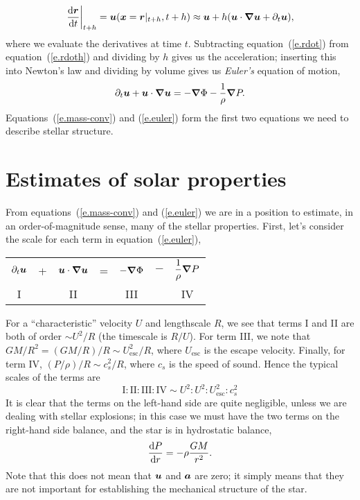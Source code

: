 \begin{equation}\label{e.rdoth}
\left.\frac{\mathrm{d}\boldsymbol{r}}{\mathrm{d} t}\right|_{t+h} = \boldsymbol{u}(\boldsymbol{x} = \boldsymbol{r}|_{t+h},t+h)\approx \boldsymbol{u} + h(\boldsymbol{u}\cdot\boldsymbol{\nabla}\boldsymbol{u} + \partial_{t}\boldsymbol{u}),
\end{equation}
where we evaluate the derivatives at time $t$. Subtracting equation~(\ref{e.rdot}) from equation~(\ref{e.rdoth}) and dividing by $h$ gives us the acceleration; inserting this into Newton's law and dividing by volume gives us \emph{Euler's} equation of motion,
\begin{equation}\label{e.euler}
\partial_{t}\boldsymbol{u} + \boldsymbol{u}\cdot\boldsymbol{\nabla}\boldsymbol{u} = -\boldsymbol{\nabla} \Phi - \frac{1}{\rho}\boldsymbol{\nabla} P.
\end{equation}
Equations~(\ref{e.mass-conv}) and (\ref{e.euler}) form the first two equations we need to describe stellar structure.

\section{Estimates of solar properties}

From equations~(\ref{e.mass-conv}) and (\ref{e.euler}) we are in a position to estimate, in an order-of-magnitude sense, many of the stellar properties.  First, let's consider the scale for each term in equation~(\ref{e.euler}),
\begin{center}\begin{tabular}{ccccccc}
$\displaystyle \partial_{t}\boldsymbol{u}$ & + &
$\displaystyle  \boldsymbol{u}\cdot\boldsymbol{\nabla}\boldsymbol{u}$ & = &
$\displaystyle -\boldsymbol{\nabla} \Phi $ & $-$ & 
$\displaystyle \frac{1}{\rho}\boldsymbol{\nabla} P$\\
I & & II & & III & & IV
\end{tabular}
\end{center}
For a ``characteristic'' velocity $U$ and lengthscale $R$, we see that terms I and II are both of order $\sim U^{2}/R$ (the timescale is $R/U$).  For term III, we note that $GM/R^{2} = (GM/R)/R \sim U_{\mathrm{esc}}^{2}/R$, where $U_{\mathrm{esc}}$ is the escape velocity.  Finally, for term IV, $(P/\rho)/R \sim c_{s}^{2}/R$, where $c_{s}$ is the speed of sound.  Hence the typical scales of the terms are
\[
\textrm{I} : \textrm{II} : \textrm{III} : \textrm{IV} \sim U^{2} : U^{2} : U_{\mathrm{esc}}^{2} : c_{s}^{2}
\]
It is clear that the terms on the left-hand side are quite negligible, unless we are dealing with stellar explosions; in this case we must have the two terms on the right-hand side balance, and the star is in hydrostatic balance, 
\begin{equation}\label{e.hydrostatic}
\frac{\mathrm{d} P}{\mathrm{d} r} = -\rho \frac{GM}{r^{2}}.
\end{equation}
Note that this does not mean that $\boldsymbol{u}$ and $\boldsymbol{a}$ are zero; it simply means that they are not important for establishing the mechanical structure of the star.

